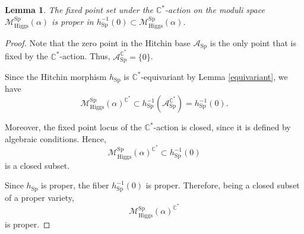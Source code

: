 \documentclass[10pt,a4paper]{amsart}
\newtheorem{lemma}{Lemma}
\begin{document}
\begin{lemma}\label{fixed1}
The fixed point set under the $\mathbb{C}^*$-action on the moduli space $\mathcal{M}^{\mathrm{Sp}}_{\mathrm{Higgs}}(\alpha)$ is proper in $h_{\mathrm{Sp}}^{-1}(0) \subset \mathcal{M}^{\mathrm{Sp}}_{\mathrm{Higgs}}(\alpha)$.
\end{lemma}

\begin{proof}
Note that the zero point in the Hitchin base $\mathcal{A}_{\mathrm{Sp}}$ is the only point that is fixed by the $\mathbb{C}^*$-action. Thus, $\mathcal{A}_{\mathrm{Sp}}^{\mathbb{C}^*} = \{0\}$.

Since the Hitchin morphism $h_{\mathrm{Sp}}$ is $\mathbb{C}^*$-equivariant by Lemma \ref{equivariant}, we have
\[
\mathcal{M}^{\mathrm{Sp}}_{\mathrm{Higgs}}(\alpha)^{\mathbb{C}^*}
\subset h_{\mathrm{Sp}}^{-1}(\mathcal{A}_{\mathrm{Sp}}^{\mathbb{C}^*})
= h_{\mathrm{Sp}}^{-1}(0).
\]

Moreover, the fixed point locus of the $\mathbb{C}^*$-action is closed, since it is defined by algebraic conditions. Hence,
\[
\mathcal{M}^{\mathrm{Sp}}_{\mathrm{Higgs}}(\alpha)^{\mathbb{C}^*}
\subset h_{\mathrm{Sp}}^{-1}(0)
\]
is a closed subset.

Since $h_{\mathrm{Sp}}$ is proper, the fiber $h_{\mathrm{Sp}}^{-1}(0)$ is proper. Therefore, being a closed subset of a proper variety,
\[
\mathcal{M}^{\mathrm{Sp}}_{\mathrm{Higgs}}(\alpha)^{\mathbb{C}^*}
\]
is proper.
\end{proof}
\end{document}
